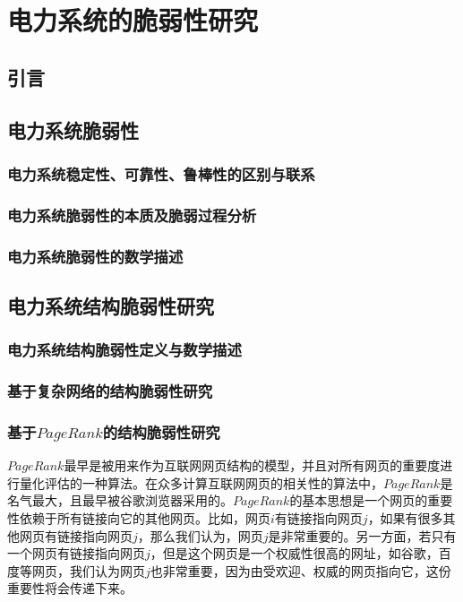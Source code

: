 \chapter{电力系统的脆弱性研究}
\label{cha:theory}

\section{引言}
\label{sec:index3}


\section{电力系统脆弱性}
\label{sec:defina}


\subsection{电力系统稳定性、可靠性、鲁棒性的区别与联系}
\label{sec:network}



\subsection{电力系统脆弱性的本质及脆弱过程分析}
\label{sec:network}



\subsection{电力系统脆弱性的数学描述}
\label{sec:network}


\section{电力系统结构脆弱性研究}
\label{sec:powersys}



\subsection{电力系统结构脆弱性定义与数学描述}
\label{sec:network}



\subsection{基于复杂网络的结构脆弱性研究}
\label{sec:network}


\subsection{基于$PageRank$的结构脆弱性研究}
\label{sec:pagerank}
$PageRank$最早是被用来作为互联网网页结构的模型，并且对所有网页的重要度进行量化评估的一种算法\cite{PR1,PR2,PR3}。在众多计算互联网网页的相关性的算法中，$PageRank$是名气最大，且最早被谷歌浏览器采用的。$PageRank$的基本思想是一个网页的重要性依赖于所有链接向它的其他网页。比如，网页$i$有链接指向网页$j$，如果有很多其他网页有链接指向网页$j$，那么我们认为，网页$j$是非常重要的。另一方面，若只有一个网页有链接指向网页$j$，但是这个网页是一个权威性很高的网址，如谷歌，百度等网页，我们认为网页$j$也非常重要，因为由受欢迎、权威的网页指向它，这份重要性将会传递下来。

